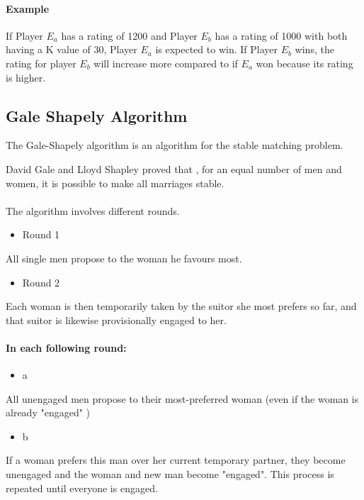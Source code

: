 \paragraph{Example} If Player $E_a$ has a rating of 1200 and Player $E_b$ has a rating of 1000 with both having a K value of 30, Player $E_a$ is expected to win. If Player $E_b$ wins, the rating for player $E_b$ will increase more compared to if $E_a$ won because its rating is higher.\vfill

\subsection{Gale Shapely Algorithm}
The Gale-Shapely algorithm \cite{dubins1981machiavelli} is an algorithm for the stable matching problem. \cite{gale1985some}


David Gale and Lloyd Shapley proved that \cite{gale1962college}, for an equal number of men and women, it is possible to make all marriages stable. 

\paragraph{}
The algorithm involves different rounds.

\begin{itemize}
	\item Round 1
\end{itemize}
All single men propose to the woman he favours most.
\begin{itemize}
	\item Round 2
\end{itemize}
Each woman is then temporarily taken by the suitor she most prefers so far, and that suitor is likewise provisionally engaged to her.
\paragraph{In each following round:}
\begin{itemize}
	\item a
\end{itemize}
All unengaged men propose to their most-preferred woman (even if the woman is already "engaged" )
\begin{itemize}
	\item b
\end{itemize}
If a woman prefers this man over her current temporary partner, they become unengaged and the woman and new man become "engaged".
This process is repeated until everyone is engaged.

